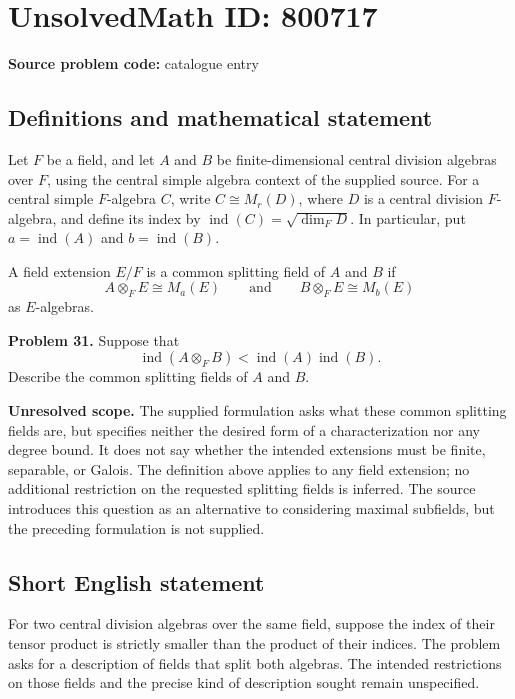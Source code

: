 \documentclass[11pt]{article}
\begin{document}
\section*{UnsolvedMath ID: 800717}
\textbf{Source problem code:} catalogue entry
\subsection{Definitions and mathematical statement}
Let \(F\) be a field, and let \(A\) and \(B\) be finite-dimensional central division algebras over \(F\), using the central simple algebra context of the supplied source. For a central simple \(F\)-algebra \(C\), write \(C\cong M_r(D)\), where \(D\) is a central division \(F\)-algebra, and define its index by \(\operatorname{ind}(C)=\sqrt{\dim_F D}\). In particular, put \(a=\operatorname{ind}(A)\) and \(b=\operatorname{ind}(B)\).

A field extension \(E/F\) is a common splitting field of \(A\) and \(B\) if
\[
A\otimes_F E\cong M_a(E)
\qquad\text{and}\qquad
B\otimes_F E\cong M_b(E)
\]
as \(E\)-algebras.

\textbf{Problem 31.} Suppose that
\[
\operatorname{ind}(A\otimes_F B)
<\operatorname{ind}(A)\operatorname{ind}(B).
\]
Describe the common splitting fields of \(A\) and \(B\).

\textbf{Unresolved scope.} The supplied formulation asks what these common splitting fields are, but specifies neither the desired form of a characterization nor any degree bound. It does not say whether the intended extensions must be finite, separable, or Galois. The definition above applies to any field extension; no additional restriction on the requested splitting fields is inferred. The source introduces this question as an alternative to considering maximal subfields, but the preceding formulation is not supplied.
\subsection{Short English statement}
For two central division algebras over the same field, suppose the index of their tensor product is strictly smaller than the product of their indices. The problem asks for a description of fields that split both algebras. The intended restrictions on those fields and the precise kind of description sought remain unspecified.
\end{document}
